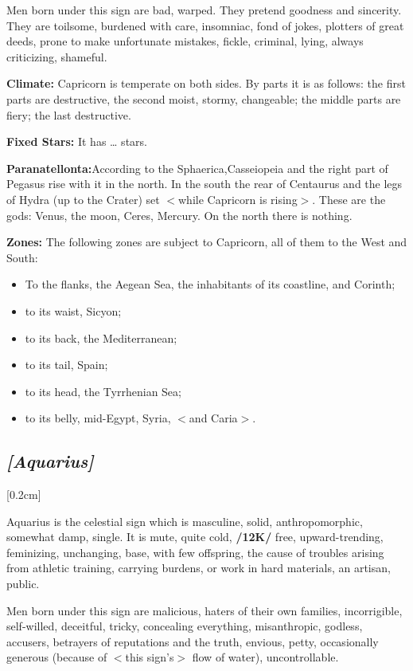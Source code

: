 Men born under this sign are bad, warped. They pretend goodness and sincerity. They are toilsome, burdened with care, insomniac, fond of jokes, plotters of great deeds, prone to make unfortunate mistakes, fickle, criminal, lying, always criticizing, shameful.

\textbf{Climate:} Capricorn is temperate on both sides. By parts it is as follows: the first parts are destructive, the
second moist, stormy, changeable; the middle parts are fiery; the last destructive. 

\textbf{Fixed Stars:} It has … stars.

\textbf{Paranatellonta:}According to the Sphaerica,Casseiopeia and the right part of Pegasus rise with it in the north. In the south the rear of Centaurus and the legs of Hydra (up to the Crater) set $<$while Capricorn is rising$>$. These are the gods: Venus, the moon, Ceres, Mercury. On the north there is nothing.

\textbf{Zones:} The following zones are subject to Capricorn, all of them to the West and South: 
\begin{itemize}
\item To the flanks, the Aegean Sea, the inhabitants of its coastline, and Corinth; 
\item to its waist, Sicyon; 
\item to its back, the Mediterranean; 
\item to its tail, Spain; 
\item to its head, the Tyrrhenian Sea; 
\item to its belly, mid-Egypt, Syria, $<$and Caria$>$.
\end{itemize}

\secbr
\subsection{\textit{[Aquarius]}}
[0.2cm]

Aquarius is the celestial sign which is masculine, solid, anthropomorphic, somewhat damp, single. It is mute, quite cold, \textbf{/12K/} free, upward-trending, feminizing, unchanging, base, with few offspring, the cause of troubles arising from athletic training, carrying burdens, or work in hard materials, an artisan, public. 

Men born under this sign are malicious, haters of their own families, incorrigible, self-willed, deceitful, tricky, concealing everything, misanthropic, godless, accusers, betrayers of reputations and the truth, envious, petty, occasionally generous (because of $<$this sign’s$>$ flow of water), uncontrollable.

